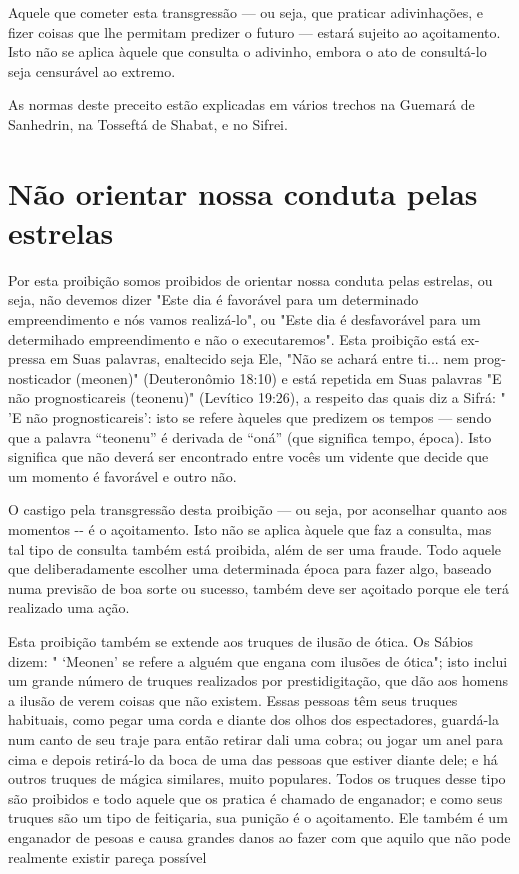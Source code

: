 Aquele que cometer esta transgressão --- ou seja, que praticar
adivi­nhações, e fizer coisas que lhe permitam predizer o futuro ---
estará sujeito ao açoitamento. Isto não se aplica àquele que consulta o
adivinho, embora o ato de consultá-lo seja censurável ao extremo.

As normas deste preceito estão explicadas em vários trechos na Gue­mará
de Sanhedrin, na Tosseftá de Shabat, e no Sifrei.

\section{Não orientar nossa conduta pelas estrelas}

Por esta proibição somos proibidos de orientar nossa conduta pelas
estrelas, ou seja, não devemos dizer "Este dia é favorável para um
determinado empreendimento e nós vamos realizá-lo", ou "Este dia é
desfavorável para um determihado empreendimento e não o executaremos".
Esta proibição está ex­pressa em Suas palavras, enaltecido seja Ele,
"Não se achará entre ti... nem prog­nosticador (meonen)" (Deuteronômio
18:10) e está repetida em Suas palavras "E não prognosticareis
(teonenu)" (Levítico 19:26), a respeito das quais diz a Sifrá: " 'E não
prognosticareis': isto se refere àqueles que predizem os tempos ---
sendo que a palavra ``teonenu'' é derivada de ``oná'' (que significa tempo,
época). Isto significa que não deverá ser encontrado entre vocês um
vidente que decide que um momento é favorável e outro não.

O castigo pela transgressão desta proibição --- ou seja, por aconse­lhar
quanto aos momentos -\/- é o açoitamento. Isto não se aplica àquele que
faz a consulta, mas tal tipo de consulta também está proibida, além de
ser uma fraude. Todo aquele que deliberadamente escolher uma determinada
época para fazer algo, baseado numa previsão de boa sorte ou sucesso,
também deve ser açoitado porque ele terá realizado uma ação.

Esta proibição também se extende aos truques de ilusão de ótica. Os
Sábios dizem: " `Meonen' se refere a alguém que engana com ilusões de
óti­ca"; isto inclui um grande número de truques realizados por
prestidigitação, que dão aos homens a ilusão de verem coisas que não
existem. Essas pessoas têm seus truques habituais, como pegar uma corda
e diante dos olhos dos es­pectadores, guardá-la num canto de seu traje
para então retirar dali uma cobra; ou jogar um anel para cima e depois
retirá-lo da boca de uma das pessoas que estiver diante dele; e há
outros truques de mágica similares, muito populares. Todos os truques
desse tipo são proibidos e todo aquele que os pratica é cha­mado de
enganador; e como seus truques são um tipo de feitiçaria, sua punição é
o açoitamento. Ele também é um enganador de pesoas e causa grandes
da­nos ao fazer com que aquilo que não pode realmente existir pareça
possível


